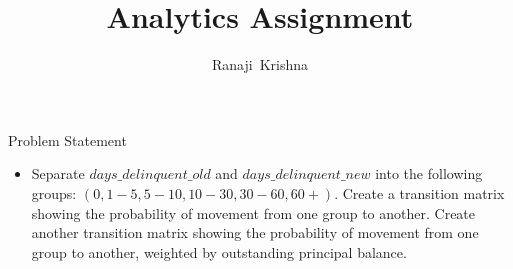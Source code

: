 \documentclass{beamer}
\title{Analytics Assignment}
\author{Ranaji~Krishna}
\begin{document}
\begin{frame}
  \titlepage
\end{frame}

\begin{frame}{Problem Statement}{}
	\begin{itemize}
		\item{Separate $days\_delinquent\_old$ and $days\_delinquent\_new$ into the following groups: $(0, 1-5, 5-10, 10-30, 30-60, 60+)$. Create a transition matrix showing the probability of movement from one group to another. Create another transition matrix showing the probability of movement from one group to another, weighted by outstanding principal balance.} \vspace{0 in} \newline 
	\end{itemize}
\end{frame}
\end{document}
